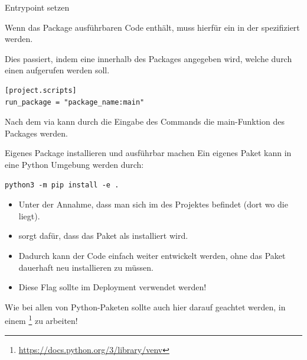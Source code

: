\documentclass[12pt, aspectratio=169, usepdftitle=false]{beamer}
\newcommand{\furl}[1]{\footnote{\url{#1}}}
\begin{document}
\begin{frame}[fragile]{Entrypoint setzen}

	Wenn das Package  ausführbaren Code enthält, muss hierfür ein  in der  spezifiziert werden.
		
		\medskip
		
	Dies passiert, indem eine  innerhalb des Packages angegeben wird, welche durch einen  aufgerufen werden soll.

	
	
	\begin{lstlisting}[language=pytiny]
[project.scripts]
run_package = "package_name:main"
	\end{lstlisting}
	
	

 Nach dem  via  kann durch die Eingabe des Commands  die main-Funktion des Packages   werden.

	
\end{frame}

\begin{frame}[fragile]{Eigenes Package installieren und ausführbar machen}
	Ein eigenes Paket kann in eine Python Umgebung  werden durch:
		
	\medskip
	
	\begin{lstlisting}[language=pytiny]
python3 -m pip install -e .
	\end{lstlisting}
	
	\medskip
	
	\begin{itemize}
		\pause
		\item Unter der Annahme, dass man sich im  des Projektes befindet (dort wo die  liegt).
		\pause
		\item {} sorgt dafür, dass das Paket als  installiert wird.
		\item[] Dadurch kann der Code einfach weiter entwickelt werden, ohne das Paket dauerhaft neu installieren zu müssen.
		\pause
		\item[] Diese Flag sollte  im Deployment verwendet werden!
	\end{itemize}
	
	\medskip
	
	Wie bei allen  von Python-Paketen sollte auch hier darauf geachtet werden, in einem \furl{https://docs.python.org/3/library/venv} zu arbeiten!

	
\end{frame}
\end{document}

